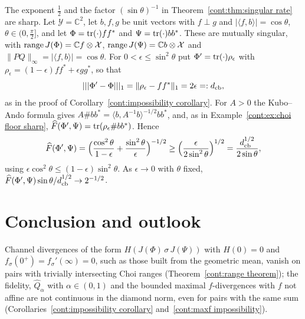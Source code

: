 \begin{example}\label{cont:ex:singular rate sharp}
The exponent $\frac12$ and the factor $(\sin\theta)^{-1}$ in Theorem~\ref{cont:thm:singular rate} are sharp. Let $\mathcal{Y}=\mathbb{C}^2$, let $b,f,g$ be unit vectors with $f\perp g$ and $|\langle f,b\rangle|=\cos\theta$, $\theta\in(0,\frac\pi2]$, and let $\Phi=\operatorname{tr}(\cdot)ff^*$ and $\Psi=\operatorname{tr}(\cdot)bb^*$. These are mutually singular, with $\operatorname{range} J(\Phi)=\mathbb{C}f\otimes\mathcal{X}$, $\operatorname{range} J(\Psi)=\mathbb{C}b\otimes\mathcal{X}$ and $\|PQ\|_\infty=|\langle f,b\rangle|=\cos\theta$. For $0<\epsilon\leq\sin^2\theta$ put $\Phi'=\operatorname{tr}(\cdot)\rho_\epsilon$ with $\rho_\epsilon=(1-\epsilon)ff^*+\epsilon gg^*$, so that
\[
|||\Phi'-\Phi|||_1=\|\rho_\epsilon-ff^*\|_1=2\epsilon=:d_{\rm cb},
\]
as in the proof of Corollary~\ref{cont:impossibility corollary}. For $A>0$ the Kubo--Ando formula gives $A\#bb^*=\langle b,A^{-1}b\rangle^{-1/2}bb^*$, and, as in Example~\ref{cont:ex:choi floor sharp}, $\widehat{F}(\Phi',\Psi)=\operatorname{tr}(\rho_\epsilon\#bb^*)$. Hence
\[
\widehat{F}(\Phi',\Psi)=\Big(\frac{\cos^2\theta}{1-\epsilon}+\frac{\sin^2\theta}{\epsilon}\Big)^{-1/2}\geq\Big(\frac{\epsilon}{2\sin^2\theta}\Big)^{1/2}=\frac{d_{\rm cb}^{1/2}}{2\sin\theta},
\]
using $\epsilon\cos^2\theta\leq(1-\epsilon)\sin^2\theta$. As $\epsilon\to0$ with $\theta$ fixed, $\widehat{F}(\Phi',\Psi)\sin\theta/d_{\rm cb}^{1/2}\to2^{-1/2}$.
\end{example}


\section{Conclusion and outlook}\label{cont:sec:conclusion}

Channel divergences of the form $H(J(\Phi)\,\sigma\,J(\Psi))$ with $H(0)=0$ and $f_\sigma(0^+)=f_\sigma'(\infty)=0$, such as those built from the geometric mean, vanish on pairs with trivially intersecting Choi ranges (Theorem~\ref{cont:range theorem}); the fidelity, $\widehat{Q}_\alpha$ with $\alpha\in(0,1)$ and the bounded maximal $f$-divergences with $f$ not affine are not continuous in the diamond norm, even for pairs with the same sum (Corollaries~\ref{cont:impossibility corollary} and~\ref{cont:maxf impossibility}).

